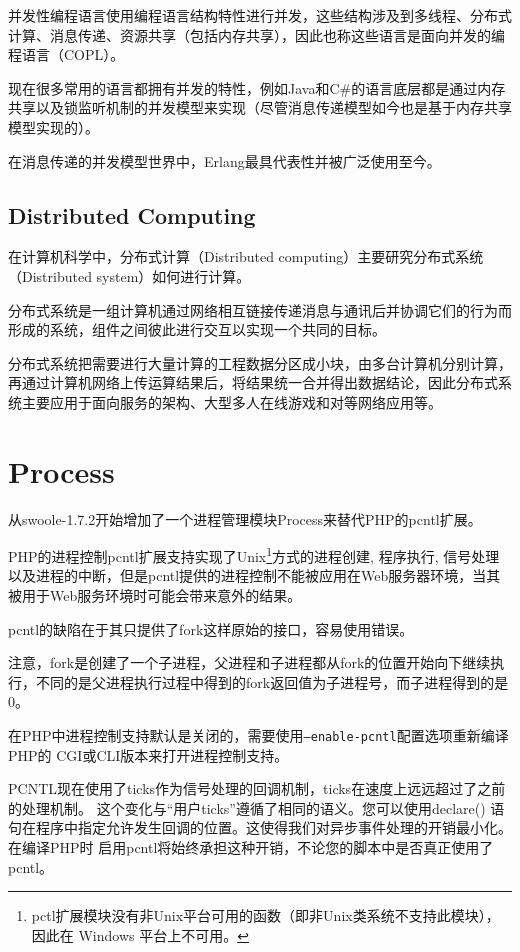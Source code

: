 并发性编程语言使用编程语言结构特性进行并发，这些结构涉及到多线程、分布式计算、消息传递、资源共享（包括内存共享），因此也称这些语言是面向并发的编程语言（COPL）。

现在很多常用的语言都拥有并发的特性，例如Java和C\#的语言底层都是通过内存共享以及锁监听机制的并发模型来实现（尽管消息传递模型如今也是基于内存共享模型实现的）。

在消息传递的并发模型世界中，Erlang最具代表性并被广泛使用至今。

\subsection{Distributed Computing}

在计算机科学中，分布式计算（Distributed computing）主要研究分布式系统（Distributed system）如何进行计算。

分布式系统是一组计算机通过网络相互链接传递消息与通讯后并协调它们的行为而形成的系统，组件之间彼此进行交互以实现一个共同的目标。

分布式系统把需要进行大量计算的工程数据分区成小块，由多台计算机分别计算，再通过计算机网络上传运算结果后，将结果统一合并得出数据结论，因此分布式系统主要应用于面向服务的架构、大型多人在线游戏和对等网络应用等。




\section{Process}



从swoole-1.7.2开始增加了一个进程管理模块Process来替代PHP的pcntl扩展。

PHP的进程控制pcntl扩展支持实现了Unix\footnote{pctl扩展模块没有非Unix平台可用的函数（即非Unix类系统不支持此模块），因此在 Windows 平台上不可用。}方式的进程创建, 程序执行, 信号处理以及进程的中断，但是pcntl提供的进程控制不能被应用在Web服务器环境，当其被用于Web服务环境时可能会带来意外的结果。

pcntl的缺陷在于其只提供了fork这样原始的接口，容易使用错误。

注意，fork是创建了一个子进程，父进程和子进程都从fork的位置开始向下继续执行，不同的是父进程执行过程中得到的fork返回值为子进程号，而子进程得到的是0。

在PHP中进程控制支持默认是关闭的，需要使用\texttt{--enable-pcntl}配置选项重新编译PHP的 CGI或CLI版本来打开进程控制支持。

PCNTL现在使用了ticks作为信号处理的回调机制，ticks在速度上远远超过了之前的处理机制。 这个变化与“用户ticks”遵循了相同的语义。您可以使用declare() 语句在程序中指定允许发生回调的位置。这使得我们对异步事件处理的开销最小化。在编译PHP时 启用pcntl将始终承担这种开销，不论您的脚本中是否真正使用了pcntl。

